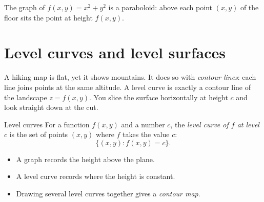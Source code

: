 \begin{center}

{\small\color{navy} The graph of $f(x,y)=x^2+y^2$ is a paraboloid: above each point
$(x,y)$ of the floor sits the point at height $f(x,y)$.}
\end{center}

\section{Level curves and level surfaces}\label{sec:level}

\begin{intuition}
A hiking map is flat, yet it shows mountains. It does so with \emph{contour lines}:
each line joins points at the same altitude. A level curve is exactly a contour line of
the landscape $z=f(x,y)$. You slice the surface horizontally at height $c$ and look
straight down at the cut.
\end{intuition}

\begin{definition}{Level curves}
For a function $f(x,y)$ and a number $c$, the \emph{level curve of $f$ at level $c$} is
the set of points $(x,y)$ where $f$ takes the value $c$:
\[ \{(x,y) : f(x,y)=c\}. \]
\end{definition}

\begin{itemize}
  \item A graph records the height above the plane.
  \item A level curve records where the height is constant.
  \item Drawing several level curves together gives a \emph{contour map}.
\end{itemize}

